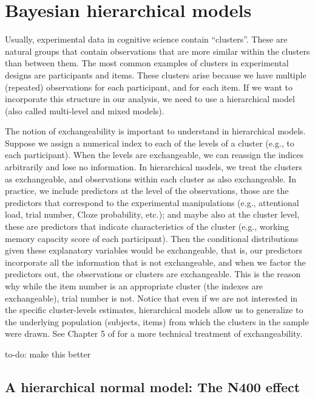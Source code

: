\documentclass[12pt,]{krantz}
\makeatletter
\newenvironment{kframe}{%
\medskip{}
\setlength{\fboxsep}{.8em}
 \def\at@end@of@kframe{}%
 \ifinner\ifhmode%
  \def\at@end@of@kframe{\end{minipage}}%
  \begin{minipage}{\columnwidth}%
 \fi\fi%
 \def\FrameCommand##1{\hskip\@totalleftmargin \hskip-\fboxsep
 \colorbox{shadecolor}{##1}\hskip-\fboxsep
     \hskip-\linewidth \hskip-\@totalleftmargin \hskip\columnwidth}%
 \MakeFramed {\advance\hsize-\width
   \@totalleftmargin\z@ \linewidth\hsize
   \@setminipage}}%
 {\par\unskip\endMakeFramed%
 \at@end@of@kframe}
\newenvironment{rmdblock}[1]
  {
  \begin{itemize}
  \renewcommand{\labelitemi}{
    \raisebox{-.7\height}[0pt][0pt]{
      {\setkeys{Gin}{width=3em,keepaspectratio}\texttt{[image: images/\#1]}}
    }
  }
  \setlength{\fboxsep}{1em}
  \begin{kframe}
  \item
  }
  {
  \end{kframe}
  \end{itemize}
  }
\newenvironment{rmdnote}
  {\begin{rmdblock}{note}}
  {\end{rmdblock}}
\theoremstyle{definition}
\theoremstyle{definition}
\theoremstyle{definition}
\theoremstyle{remark}
\makeatother
\begin{document}
\hypertarget{ch:hierarchical}{%
\chapter{Bayesian hierarchical models}\label{ch:hierarchical}}

Usually, experimental data in cognitive science contain ``clusters''. These are natural groups that contain observations that are more similar within the clusters than between them.
The most common examples of clusters in experimental designs are participants and items. These clusters arise because we have multiple (repeated) observations for each participant, and for each item. If we want to incorporate this structure in our analysis, we need to use a hierarchical model (also called multi-level and mixed models).

The notion of exchangeability is important to understand in hierarchical models. Suppose we assign a numerical index to each of the levels of a cluster (e.g., to each participant). When the levels are exchangeable, we can reassign the indices arbitrarily and lose no information. In hierarchical models, we treat the clusters as exchangeable, and observations within each cluster as also exchangeable. In practice, we include predictors at the level of the observations, those are the predictors that correspond to the experimental manipulations (e.g., attentional load, trial number, Cloze probability, etc.); and maybe also at the cluster level, these are predictors that indicate characteristics of the cluster (e.g., working memory capacity score of each participant). Then the conditional distributions given these explanatory variables would be exchangeable, that is, our predictors incorporate all the information that is not exchangeable, and when we factor the predictors out, the observations or clusters are exchangeable. This is the reason why while the item number is an appropriate cluster (the indexes are exchangeable), trial number is not. Notice that even if we are not interested in the specific cluster-levels estimates, hierarchical models allow us to generalize to the underlying population (subjects, items) from which the clusters in the sample were drawn. See Chapter 5 of \citet{Gelman14} for a more technical treatment of exchangeability.

\begin{rmdnote}
to-do: make this better
\end{rmdnote}

\hypertarget{sec:N400hierarchical}{%
\section{A hierarchical normal model: The N400 effect}\label{sec:N400hierarchical}}
\end{document}
